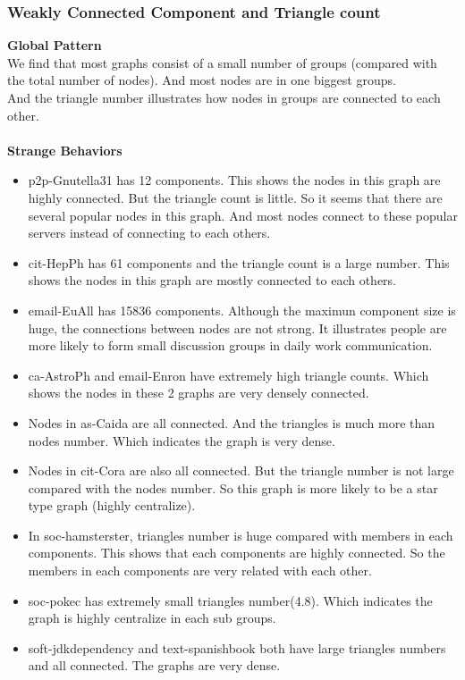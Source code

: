 
\subsubsection{Weakly Connected Component and Triangle count}
\textbf{Global Pattern} \\
We find that most graphs consist of a small number of groups (compared with the total number of nodes). And most nodes are in one biggest groups. \\
And the triangle number illustrates how nodes in groups are connected to each other. \\
\\
\textbf{Strange Behaviors} \\
\begin{itemize} 
\item p2p-Gnutella31 has 12 components. This shows the nodes in this graph are highly connected. But the triangle count is little. So it seems that there are several popular nodes in this graph. And most nodes connect to these popular servers instead of connecting to each others. \\
\item cit-HepPh has 61 components and the triangle count is a large number. This shows the nodes in this graph are mostly connected to each others. \\
\item email-EuAll has 15836 components. Although the maximun component size is huge, the connections between nodes are not strong. It illustrates people are more likely to form small discussion groups in daily work communication.\\
\item ca-AstroPh and email-Enron have extremely high triangle counts. Which shows the nodes in these 2 graphs are very densely connected.\\
\item Nodes in as-Caida are all connected. And the triangles is much more than nodes number. Which indicates the graph is very dense. \\
\item Nodes in cit-Cora are also all connected. But the triangle number is not large compared with the nodes number. So this graph is more likely to be a star type graph (highly centralize).\\
\item In soc-hamsterster, triangles number is huge compared with members in each components. This shows that each components are highly connected. So the members in each components are very related with each other.\\
\item soc-pokec has extremely small triangles number(4.8). Which indicates the graph is highly centralize in each sub groups.\\
\item soft-jdkdependency and text-spanishbook both have large triangles numbers and all connected. The graphs are very dense. \\
\end{itemize} 
